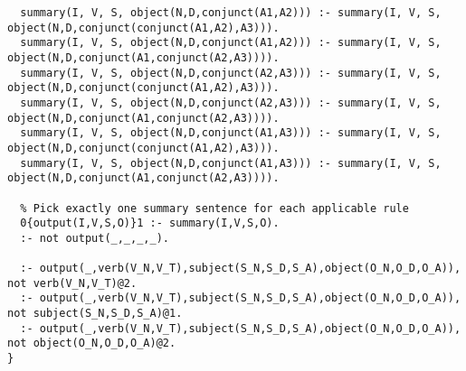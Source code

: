 \begin{lstlisting}
  summary(I, V, S, object(N,D,conjunct(A1,A2))) :- summary(I, V, S, object(N,D,conjunct(conjunct(A1,A2),A3))).
  summary(I, V, S, object(N,D,conjunct(A1,A2))) :- summary(I, V, S, object(N,D,conjunct(A1,conjunct(A2,A3)))).
  summary(I, V, S, object(N,D,conjunct(A2,A3))) :- summary(I, V, S, object(N,D,conjunct(conjunct(A1,A2),A3))).
  summary(I, V, S, object(N,D,conjunct(A2,A3))) :- summary(I, V, S, object(N,D,conjunct(A1,conjunct(A2,A3)))).
  summary(I, V, S, object(N,D,conjunct(A1,A3))) :- summary(I, V, S, object(N,D,conjunct(conjunct(A1,A2),A3))).
  summary(I, V, S, object(N,D,conjunct(A1,A3))) :- summary(I, V, S, object(N,D,conjunct(A1,conjunct(A2,A3)))).

  % Pick exactly one summary sentence for each applicable rule
  0{output(I,V,S,O)}1 :- summary(I,V,S,O).
  :- not output(_,_,_,_).

  :- output(_,verb(V_N,V_T),subject(S_N,S_D,S_A),object(O_N,O_D,O_A)), not verb(V_N,V_T)@2.
  :- output(_,verb(V_N,V_T),subject(S_N,S_D,S_A),object(O_N,O_D,O_A)), not subject(S_N,S_D,S_A)@1.
  :- output(_,verb(V_N,V_T),subject(S_N,S_D,S_A),object(O_N,O_D,O_A)), not object(O_N,O_D,O_A)@2.
}
\end{lstlisting}